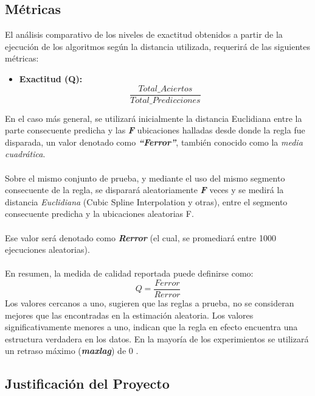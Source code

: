 \subsection{M\'etricas}
El an\'alisis comparativo de los niveles de exactitud obtenidos a partir de la ejecuci\'on de los algoritmos seg\'un la distancia utilizada, requerir\'a de las siguientes m\'etricas:
\begin{itemize}
\item \textbf{Exactitud (Q):}
\begin{equation}
 \frac{Total\_Aciertos} {Total\_Predicciones}
\end{equation}
\end{itemize}
En el caso m\'as general, se utilizar\'a inicialmente la distancia Euclidiana entre la parte consecuente predicha y las \textit{\textbf{F}} ubicaciones halladas desde donde la regla fue disparada, un valor denotado como \textit{\textbf{\enquote{Ferror}}}, tambi\'en conocido como la \textit{media cuadr\'atica}.\\\\
Sobre el mismo conjunto de prueba, y mediante el uso del mismo segmento consecuente de la regla, se disparar\'a aleatoriamente \textit{\textbf{F}} veces y se medir\'a la distancia \textit{Euclidiana} (Cubic Spline Interpolation y otras), entre el segmento consecuente predicha y la ubicaciones aleatorias F.\\\\
Ese valor ser\'a denotado como \textit{\textbf{Rerror}} (el cual, se promediar\'a entre 1000 ejecuciones aleatorias).\\\\
En resumen, la medida de calidad reportada puede definirse como: 
\begin{equation} 
Q = \frac{Ferror}{Rerror} 
\end{equation}
Los valores cercanos a uno, sugieren que las reglas a prueba, no se consideran mejores que las encontradas en la estimaci\'on aleatoria. Los valores significativamente menores a uno, indican que la regla en efecto encuentra una estructura verdadera en los datos. En la mayor\'ia de los experimientos se utilizar\'a un retraso m\'aximo (\textit{\textbf{maxlag}}) de 0 .
\subsection{Justificaci\'on del Proyecto}